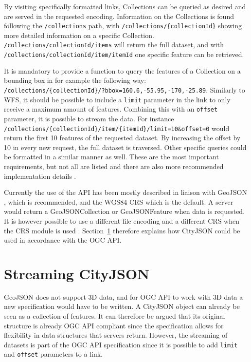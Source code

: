 By visiting specifically formatted links, Collections can be queried as desired and are served in the requested encoding.
Information on the Collections is found following the \texttt{/collections} path, with \texttt{/collections/\{collectionId\}} showing more detailed information on a specific Collection.
\texttt{/collections/{collectionId}/items} will return the full dataset, and with \\
 \texttt{/collections/{collectionId}/item/{itemId}} one specific feature can be retrieved.

It is mandatory to provide a function to query the features of a Collection on a bounding box in for example the following way: \texttt{/collections/\{collectionId\}/?bbox=160.6,-55.95,-170,-25.89}.
Similarly to WFS, it should be possible to include a \texttt{limit} parameter in the link to only receive a maximum amount of features.
Combining this with an \texttt{offset} parameter, it is possible to stream the data.
For instance \texttt{/collections/\{collectionId\}/item/\{itemId\}/limit=10\&offset=0} would return the first 10 features of the requested dataset.
By increasing the offset by 10 in every new request, the full dataset is traversed.
Other specific queries could be formatted in a similar manner as well.
These are the most important requirements, but not all are listed and there are also more recommended implementation details \citep{OGC2019}.


Currently the use of the API has been mostly described in liaison with GeoJSON \citep{GeoJSON}, which is recommended, and the WGS84 CRS which is the default.
A server would return a GeoJSONCollection or GeoJSONFeature when data is requested.
It is however possible to use a different file encoding and a different CRS when the CRS module is used \citep{OGC2019}.
Section~\ref{sec:streamingcityjson} therefore explains how CityJSON could be used in accordance with the OGC API.







\section{Streaming CityJSON}
\label{sec:streamingcityjson}
GeoJSON \citep{GeoJSON} does not support 3D data, and for OGC API to work with 3D data a new specification would have to be written.
A CityJSON object can already be seen as a collection of features.
It can therefore be argued that its original structure is already OGC API compliant since the specification allows for flexibility in data structures that servers return.
However, the streaming of datasets is part of the OGC API specification since it is possible to add \texttt{limit} and \texttt{offset} parameters to a link.

